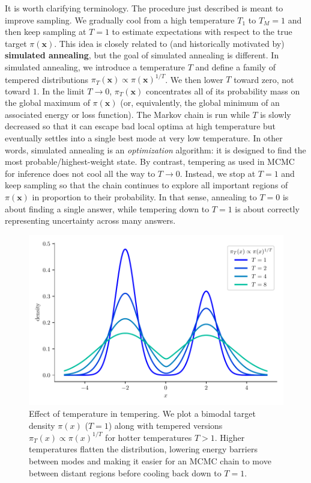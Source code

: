It is worth clarifying terminology. The procedure just described is meant to improve sampling. We gradually cool from a high temperature $T_1$ to
$T_M = 1$ and then keep sampling at $T=1$ to estimate expectations with respect to the true target $\pi(\mathbf{x})$. This idea is closely related to (and historically motivated by) \textbf{simulated annealing}, but the goal of simulated annealing is different. In simulated annealing, we introduce a
temperature $T$ and define a family of tempered distributions $\pi_T(\mathbf{x}) \propto \pi(\mathbf{x})^{1/T}$. We then lower $T$
toward zero, not toward $1$. In the limit $T \to 0$, $\pi_T(\mathbf{x})$ concentrates all of its probability mass on the global maximum of
$\pi(\mathbf{x})$ (or, equivalently, the global minimum of an associated energy or loss function). The Markov chain is run while $T$ is slowly decreased
so that it can escape bad local optima at high temperature but eventually settles into a single best mode at very low temperature. In other words,
simulated annealing is an \emph{optimization} algorithm: it is designed to find the most probable/highest-weight state. By contrast, tempering as used in MCMC for inference does not cool all the way to $T \to 0$. Instead, we stop at $T=1$ and keep sampling so that the chain continues to explore all important regions of $\pi(\mathbf{x})$ in proportion to their probability. In that sense, annealing to $T=0$ is about finding a single answer, while tempering down to $T=1$ is about correctly representing uncertainty across many answers.

\begin{figure}[H]
    \centering
    \includegraphics[width=.5\textwidth]{./figs/monte-carlo/simulated_annealing_flattening.pdf}
    \caption{Effect of temperature in tempering. We plot a bimodal target density $\pi(x)$ ($T{=}1$) along with tempered versions $\pi_T(x) \propto \pi(x)^{1/T}$ for hotter temperatures $T>1$. Higher temperatures flatten the distribution, lowering energy barriers between modes and making it easier for an MCMC chain to move between distant regions before cooling back down to $T=1$.}
    \label{fig:simulated-annealing-flattening}
\end{figure}

